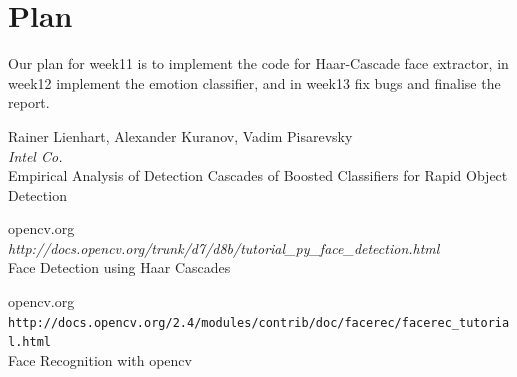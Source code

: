 \documentclass[10pt,a4paper]{article}
\begin{document}
  \section{Plan}
    Our plan for week11 is to implement the code for Haar-Cascade face extractor, in week12 implement the emotion classifier, and in week13 fix bugs and finalise the report.

	\begin{thebibliography}{9}
    Rainer Lienhart, Alexander Kuranov, Vadim Pisarevsky\\
    \textit{Intel Co.}\\
    Empirical Analysis of Detection Cascades of Boosted Classifiers for Rapid Object Detection

    opencv.org\\
    \textit{http://docs.opencv.org/trunk/d7/d8b/tutorial\_py\_face\_detection.html}\\
    Face Detection using Haar Cascades

    opencv.org\\
    \texttt{http://docs.opencv.org/2.4/modules/contrib/doc/facerec/facerec\_tutorial.html}\\
    Face Recognition with opencv
  \end{thebibliography}
\end{document}
